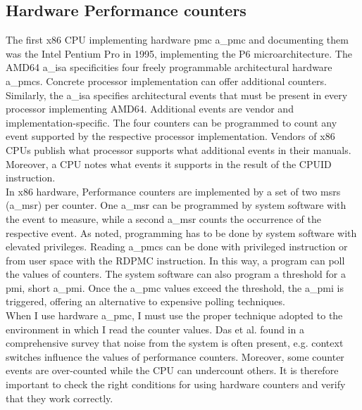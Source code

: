 \subsection{Hardware Performance counters}
\label{sec:state:technical:hpc}
The first x86 CPU implementing hardware \gls{pmc} \acrshort{a_pmc} and
documenting them was the Intel Pentium Pro in 1995, implementing the P6
microarchitecture.\cite{intel_sdm} The AMD64 \acrshort{a_isa} specificities four
freely programmable architectural hardware \acrshort{a_pmc}s.\cite{amd_manual}
Concrete processor implementation can offer additional counters. Similarly, the
\acrshort{a_isa} specifies architectural events that must be present in every
processor implementing AMD64. Additional events are vendor and
implementation-specific. The four counters can be programmed to count any event
supported by the respective processor implementation. Vendors of x86 CPUs
publish what processor supports what additional events in their manuals.
Moreover, a CPU notes what events it supports in the result of the \gls{CPUID}
instruction. \\

In x86 hardware, Performance counters are implemented by a set of two \gls{msr}s
(\acrshort{a_msr}) per counter. One \acrshort{a_msr} can be programmed by system
software with the event to measure, while a second \acrshort{a_msr} counts the
occurrence of the respective event. As noted, programming has to be done by
system software with elevated privileges. Reading \acrlong{a_pmc}s can be done
with privileged instruction or from user space with the RDPMC instruction. In
this way, a program can poll the values of counters. The system software can
also program a threshold for a \gls{pmi}, short \acrshort{a_pmi}. Once the
\acrshort{a_pmc} values exceed the threshold, the \acrshort{a_pmi} is triggered,
offering an alternative to expensive polling techniques.\\

When I use hardware \acrshort{a_pmc}, I must use the proper technique adopted
to the environment in which I read the counter values. Das et al. found in a
comprehensive survey that noise from the system is often present, e.g. context
switches influence the values of performance counters. \cite{das_sok_2019}
Moreover, some counter events are over-counted while the CPU can undercount
others.\cite{weaver_non-determinism_2013} It is therefore important to check the
right conditions for using hardware counters and verify that they work
correctly.

